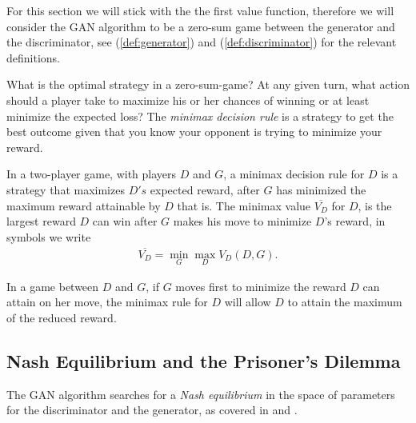 \begin{remark} For this section we will stick with the the first value
  function, therefore we will consider the GAN algorithm to be a
  zero-sum game between the generator and the discriminator, see
  (\ref{def:generator}) and (\ref{def:discriminator}) for the relevant
  definitions.
\end{remark}

What is the optimal strategy in a zero-sum-game? At any given turn,
what action should a player take to maximize his or her chances of
winning or at least minimize the expected loss? The \textit{minimax
  decision rule} is a strategy to get the best outcome given that you
know your opponent is trying to minimize your reward.

\begin{definition}
  \label{def:minimax}
  \label{def:minimax-value} In a two-player game, with players $D$ and
  $G$, a \textnormal{\sffamily minimax decision rule} for $D$ is a
  strategy that maximizes $D's$ expected reward, after $G$ has
  minimized the maximum reward attainable by $D$ that is. The
  \textnormal{\sffamily minimax value} $\overline{V_D}$ for $D$, is
  the largest reward $D$ can win after $G$ makes his move to minimize
  $D$'s reward, in symbols we write
  \begin{align} \overline{V_D} = \min_{G} \max_{D} V_D(D, {G}).
  \end{align}
\end{definition}

In a game between $D$ and $G$, if $G$ moves first to minimize the
reward $D$ can attain on her move, the minimax rule for $D$ will allow
$D$ to attain the maximum of the reduced reward.

\subsection{Nash Equilibrium and the Prisoner's Dilemma}
\label{sec:nash-dilemma}

The GAN algorithm searches for a \textit{Nash equilibrium} in the
space of parameters for the discriminator and the generator, as covered
in \cite{ref:goodfellow-2016} and \cite{ref:goodfellow-2017}.

